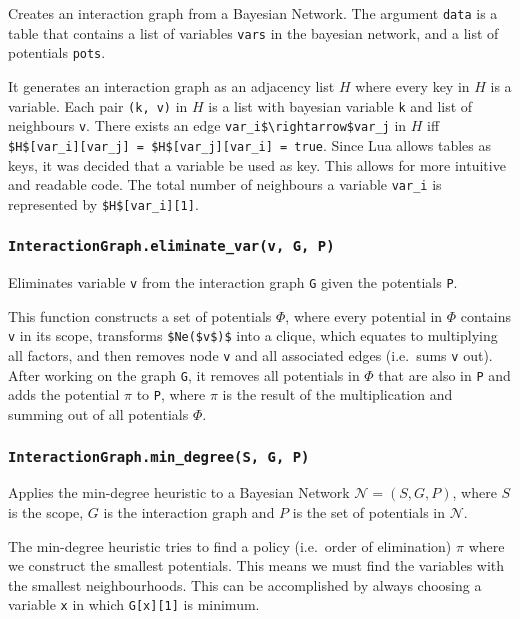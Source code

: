 \documentclass{amsart}
\theoremstyle{plain}
\newcommand{\code}[1]{\lstinline[mathescape=true]{#1}}
\newcommand{\mcode}[1]{\lstinline[mathescape]!#1!}
\begin{document}
Creates an interaction graph from a Bayesian Network. The argument \code{data} is a table that
contains a list of variables \code{vars} in the bayesian network, and a list of potentials
\code{pots}.

It generates an interaction graph as an adjacency list $H$ where every key in $H$ is a variable.
Each pair \code{(k, v)} in $H$ is a list with bayesian variable \code{k} and list of neighbours
\code{v}. There exists an edge \mcode{var_i$\rightarrow$var_j} in $H$ iff \mcode{$H$[var_i][var_j]
= $H$[var_j][var_i] = true}. Since Lua allows tables as keys, it was decided that a variable be
used as key. This allows for more intuitive and readable code. The total number of neighbours a
variable \code{var_i} is represented by \mcode{$H$[var_i][1]}.

\subsubsection{\code{InteractionGraph.eliminate_var(v, G, P)}}

Eliminates variable \code{v} from the interaction graph \code{G} given the potentials \code{P}.

This function constructs a set of potentials $\Phi$, where every potential in $\Phi$ contains
\code{v} in its scope, transforms \mcode{$Ne($v$)$} into a clique, which equates to multiplying
all factors, and then removes node \code{v} and all associated edges (i.e.\ sums \code{v} out).
After working on the graph \code{G}, it removes all potentials in $\Phi$ that are also in \code{P}
and adds the potential $\pi$ to \code{P}, where $\pi$ is the result of the multiplication and
summing out of all potentials $\Phi$.

\subsubsection{\code{InteractionGraph.min_degree(S, G, P)}}

Applies the min-degree heuristic to a Bayesian Network $\mathcal{N}=(S, G, P)$, where $S$ is the
scope, $G$ is the interaction graph and $P$ is the set of potentials in $\mathcal{N}$.

The min-degree heuristic tries to find a policy (i.e.\ order of elimination) $\pi$ where we
construct the smallest potentials. This means we must find the variables with the smallest
neighbourhoods. This can be accomplished by always choosing a variable \code{x} in which
\mcode{G[x][1]} is minimum.
\end{document}
